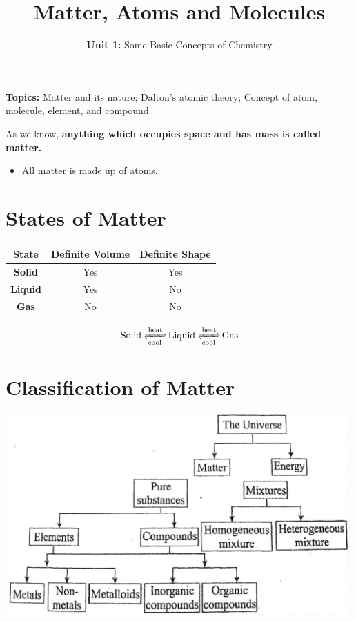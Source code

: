 \documentclass[
  14pt,
]{extarticle}
\title{Matter, Atoms and Molecules}
\subtitle{\textbf{Unit 1:} Some Basic Concepts of Chemistry}
\author{}
\date{}
\providecommand{\tightlist}{%
  \setlength{\itemsep}{0pt}\setlength{\parskip}{0pt}}
\renewenvironment{quote}{\begin{myquote}}{\end{myquote}}
\begin{document}
\maketitle
\thispagestyle{fancy}

\begin{quote}
\textbf{Topics:} Matter and its nature; Dalton's atomic theory; Concept
of atom, molecule, element, and compound
\end{quote}

As we know, \textbf{anything which occupies space and has mass is called
matter.}

\begin{itemize}
\tightlist
\item
  All matter is made up of atoms.
\end{itemize}

\hypertarget{states-of-matter}{%
\section{States of Matter}\label{states-of-matter}}

\begin{longtable}[]{@{}ccc@{}}
\toprule()
\textbf{State} & \textbf{Definite Volume} & \textbf{Definite Shape} \\
\midrule()
\endhead
\textbf{Solid} & Yes & Yes \\
\textbf{Liquid} & Yes & No \\
\textbf{Gas} & No & No \\
\bottomrule()
\end{longtable}

\[\ce{Solid <=>[heat][cool] Liquid <=>[heat][cool] Gas}\]

\hypertarget{classification-of-matter}{%
\section{Classification of Matter}\label{classification-of-matter}}

\begin{center}\includegraphics[width=5.20833in,height=\textheight]{./images/2022-06-12-15-27-41.png}\end{center}
\end{document}
